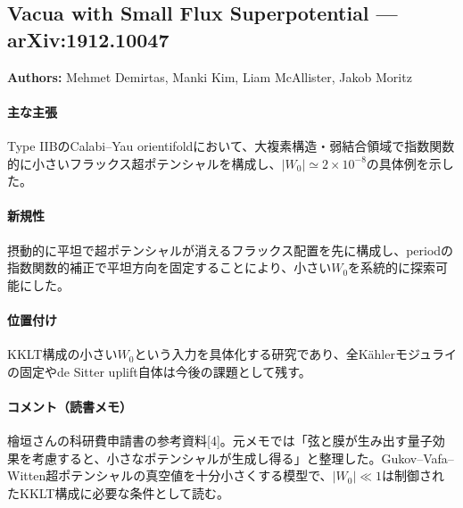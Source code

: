 \subsection{Vacua with Small Flux Superpotential --- arXiv:1912.10047}

\textbf{Authors:} Mehmet Demirtas, Manki Kim, Liam McAllister, Jakob Moritz

\paragraph{主な主張}
Type IIBのCalabi--Yau orientifoldにおいて、大複素構造・弱結合領域で指数関数的に小さいフラックス超ポテンシャルを構成し、\(\lvert W_0\rvert\simeq 2\times10^{-8}\)の具体例を示した。 \cite{Demirtas:2019sip}

\paragraph{新規性}
摂動的に平坦で超ポテンシャルが消えるフラックス配置を先に構成し、periodの指数関数的補正で平坦方向を固定することにより、小さい\(W_0\)を系統的に探索可能にした。

\paragraph{位置付け}
KKLT構成\cite{Kachru:2003aw}の小さい\(W_0\)という入力を具体化する研究であり、全K\"ahlerモジュライの固定やde Sitter uplift自体は今後の課題として残す。

\paragraph{コメント（読書メモ）}
檜垣さんの科研費申請書の参考資料[4]。元メモでは「弦と膜が生み出す量子効果を考慮すると、小さなポテンシャルが生成し得る」と整理した。Gukov--Vafa--Witten超ポテンシャルの真空値を十分小さくする模型で、\(\lvert W_0\rvert\ll1\)は制御されたKKLT構成に必要な条件として読む。
